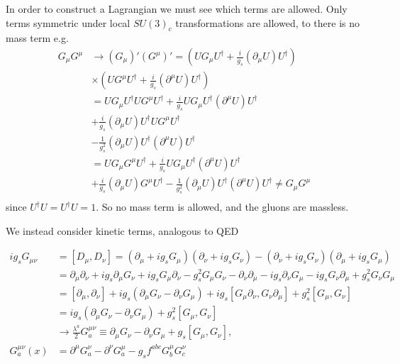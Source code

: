 \documentclass[11pt]{article}
\begin{document}
\begin{multicols}{2}
\begin{flushleft}
In order to construct a Lagrangian we must see which terms are allowed. Only terms symmetric under local $SU(3)_c$ transformations are allowed, to there is no mass term e.g.
\begin{align*}
G_{\mu} G^{\mu} &\rightarrow (G_{\mu})'(G^{\mu})' = (U G_{\mu} U^{\dagger} + \frac{i}{g_s} (\partial_{\mu} U) U^{\dagger})\\
& \times (U G^{\mu} U^{\dagger} + \frac{i}{g_s} (\partial^{\mu} U) U^{\dagger})\\
&= U G_{\mu} U^{\dagger} U G^{\mu} U^{\dagger} + \frac{i}{g_s}U G_{\mu} U^{\dagger}  (\partial^{\mu} U)U^{\dagger}\\
&+  \frac{i}{g_s} (\partial_{\mu} U) U^{\dagger}U G^{\mu} U^{\dagger}\\
& - \frac{1}{g_s^2} (\partial_{\mu} U) U^{\dagger} (\partial^{\mu} U) U^{\dagger}\\
&= U G_{\mu}  G^{\mu} U^{\dagger} + \frac{i}{g_s}U G_{\mu} U^{\dagger}  (\partial^{\mu} U)U^{\dagger}\\
&+  \frac{i}{g_s} (\partial_{\mu} U) G^{\mu} U^{\dagger} - \frac{1}{g_s^2} (\partial_{\mu} U) U^{\dagger} (\partial^{\mu} U) U^{\dagger} \neq G_{\mu}G^{\mu}\\
\end{align*}
since $U^{\dagger} U = U^{\dagger} U = 1$. So no mass term is allowed, and the gluons are massless.
\end{flushleft}

\pagebreak

\begin{flushleft}
 We instead consider kinetic terms, analogous to QED
 \end{flushleft}
\end{multicols}
\begin{align*}
i g_s G_{\mu \nu} &= [D_{\mu}, D_{\nu}] = (\partial_{\mu} + ig_s G_{\mu})(\partial_{\nu} + ig_s G_{\nu} )- (\partial_{\nu} + ig_s G_{\nu} ) (\partial_{\mu} + ig_s G_{\mu} )\\
&= \partial_{\mu} \partial_{\nu}+ ig_s \partial_{\mu}  G_{\nu} +ig_s G_{\mu} \partial_{\nu}  - g_s^2 G_{\mu} G_{\nu}
- \partial_{\nu} \partial_{\mu}- ig_s\partial_{\nu}  G_{\mu} -ig_s G_{\nu} \partial_{\mu}  + g_s^2 G_{\nu} G_{\mu}\\
&= [\partial_{\mu}, \partial_{\nu}]+ ig_s (\partial_{\mu}  G_{\nu} - \partial_{\nu}  G_{\mu}) +ig_s [G_{\mu} \partial_{\nu}, G_{\nu} \partial_{\mu}]  + g_s^2 [G_{\mu}, G_{\nu}]\\
&= ig_s (\partial_{\mu}  G_{\nu} - \partial_{\nu}  G_{\mu})   + g_s^2 [G_{\mu}, G_{\nu}]\\
& \rightarrow \frac{\lambda^a}{2} G_a^{\mu \nu} \equiv \partial_{\mu} G_{\nu} - \partial_{\nu} G_{\mu} + g_s [G_{\mu}, G_{\nu}],\\
G_a^{\mu \nu} (x) &=  \partial^{\mu} G^{\nu}_a - \partial^{\nu} G^{\mu}_a - g_s f^{abc} G^{\mu}_b G^{\nu}_c
\end{align*}
\end{document}
